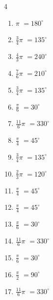 \begin{multicols}{4}
\begin{enumerate}
  \item $\displaystyle \pi$
        $\displaystyle =180^{\circ}$

  \item $\displaystyle \frac{3}{4}\pi$
        $\displaystyle =135^{\circ}$

  \item $\displaystyle \frac{4}{3}\pi$
        $\displaystyle =240^{\circ}$

  \item $\displaystyle \frac{7}{6}\pi$
        $\displaystyle =210^{\circ}$

  \item $\displaystyle \frac{3}{4}\pi$
        $\displaystyle =135^{\circ}$

  \item $\displaystyle \frac{\pi}{6}$
        $\displaystyle =30^{\circ}$

  \item $\displaystyle \frac{11}{6}\pi$
        $\displaystyle =330^{\circ}$

  \item $\displaystyle \frac{\pi}{4}$
        $\displaystyle =45^{\circ}$

  \item $\displaystyle \frac{3}{4}\pi$
        $\displaystyle =135^{\circ}$

  \item $\displaystyle \frac{2}{3}\pi$
        $\displaystyle =120^{\circ}$

  \item $\displaystyle \frac{\pi}{4}$
        $\displaystyle =45^{\circ}$

  \item $\displaystyle \frac{\pi}{4}$
        $\displaystyle =45^{\circ}$

  \item $\displaystyle \frac{\pi}{6}$
        $\displaystyle =30^{\circ}$

  \item $\displaystyle \frac{11}{6}\pi$
        $\displaystyle =330^{\circ}$

  \item $\displaystyle \frac{\pi}{6}$
        $\displaystyle =30^{\circ}$

  \item $\displaystyle \frac{\pi}{2}$
        $\displaystyle =90^{\circ}$

  \item $\displaystyle \frac{11}{6}\pi$
        $\displaystyle =330^{\circ}$


\end{enumerate}
\end{multicols}
